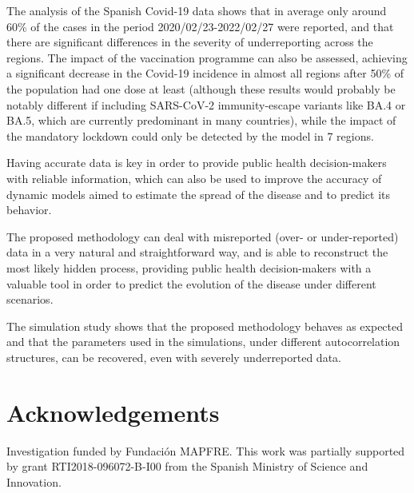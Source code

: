 \documentclass{article}
\begin{document}
The analysis of the Spanish Covid-19 data shows that in average only around 60\% of the cases in the period 2020/02/23-2022/02/27 were reported, and that there are significant differences in the severity of underreporting across the regions. The impact of the vaccination programme can also be assessed, achieving a significant decrease in the Covid-19 incidence in almost all regions after 50\% of the population had one dose at least (although these results would probably be notably different if including SARS-CoV-2 immunity-escape variants like BA.4 or BA.5, which are currently predominant in many countries), while the impact of the mandatory lockdown could only be detected by the model in 7 regions. 

Having accurate data is key in order to provide public health decision-makers with reliable information, which can also be used to improve the accuracy of dynamic models aimed to estimate the spread of the disease \cite{Zhao2020} and to predict its behavior. 

The proposed methodology can deal with misreported (over- or under-reported) data in a very natural and straightforward way, and is able to reconstruct the most likely hidden process, providing public health decision-makers with a valuable tool in order to predict the evolution of the disease under different scenarios. 

The simulation study shows that the proposed methodology behaves as expected and that the parameters used in the simulations, under different autocorrelation structures, can be recovered, even with severely underreported data.

\section*{Acknowledgements}
Investigation funded by Fundaci\'on MAPFRE. This work was partially supported by grant RTI2018-096072-B-I00 from the Spanish Ministry of Science and Innovation.

  
\end{document}
